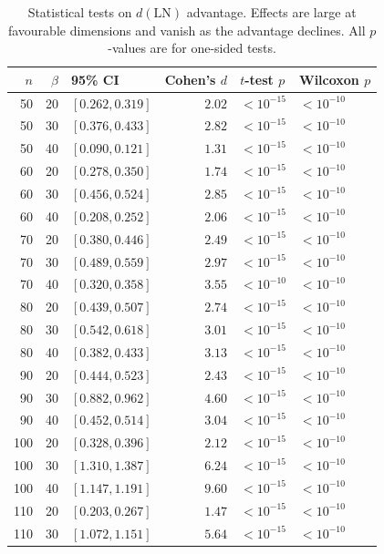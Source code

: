 \documentclass[journal=cic,version=preprint]{iacrj}
\begin{document}
\begin{table}[tbp]
\centering
\caption{Statistical tests on $d(\mathrm{LN})$ advantage. Effects are large at favourable dimensions and vanish as the advantage declines. All $p$-values are for one-sided tests.\label{tab:stats}}
\small
\begin{tabular}{rrlrll}
\hline
$n$ & $\beta$ & 95\% CI & Cohen's $d$ & $t$-test $p$ & Wilcoxon $p$ \\
\hline
50  & 20 & $[0.262, 0.319]$ & $2.02$  & $<10^{-15}$ & $<10^{-10}$ \\
50  & 30 & $[0.376, 0.433]$ & $2.82$  & $<10^{-15}$ & $<10^{-10}$ \\
50  & 40 & $[0.090, 0.121]$ & $1.31$  & $<10^{-15}$ & $<10^{-10}$ \\
60  & 20 & $[0.278, 0.350]$ & $1.74$  & $<10^{-15}$ & $<10^{-10}$ \\
60  & 30 & $[0.456, 0.524]$ & $2.85$  & $<10^{-15}$ & $<10^{-10}$ \\
60  & 40 & $[0.208, 0.252]$ & $2.06$  & $<10^{-15}$ & $<10^{-10}$ \\
70  & 20 & $[0.380, 0.446]$ & $2.49$  & $<10^{-15}$ & $<10^{-10}$ \\
70  & 30 & $[0.489, 0.559]$ & $2.97$  & $<10^{-15}$ & $<10^{-10}$ \\
70  & 40 & $[0.320, 0.358]$ & $3.55$  & $<10^{-10}$ & $<10^{-10}$ \\
80  & 20 & $[0.439, 0.507]$ & $2.74$  & $<10^{-15}$ & $<10^{-10}$ \\
80  & 30 & $[0.542, 0.618]$ & $3.01$  & $<10^{-15}$ & $<10^{-10}$ \\
80  & 40 & $[0.382, 0.433]$ & $3.13$  & $<10^{-15}$ & $<10^{-10}$ \\
90  & 20 & $[0.444, 0.523]$ & $2.43$  & $<10^{-15}$ & $<10^{-10}$ \\
90  & 30 & $[0.882, 0.962]$ & $4.60$  & $<10^{-15}$ & $<10^{-10}$ \\
90  & 40 & $[0.452, 0.514]$ & $3.04$  & $<10^{-15}$ & $<10^{-10}$ \\
100 & 20 & $[0.328, 0.396]$ & $2.12$  & $<10^{-15}$ & $<10^{-10}$ \\
100 & 30 & $[1.310, 1.387]$ & $6.24$  & $<10^{-15}$ & $<10^{-10}$ \\
100 & 40 & $[1.147, 1.191]$ & $9.60$  & $<10^{-15}$ & $<10^{-10}$ \\
110 & 20 & $[0.203, 0.267]$ & $1.47$  & $<10^{-15}$ & $<10^{-10}$ \\
110 & 30 & $[1.072, 1.151]$ & $5.64$  & $<10^{-15}$ & $<10^{-10}$ \\

\end{tabular}
\end{table}
\end{document}
